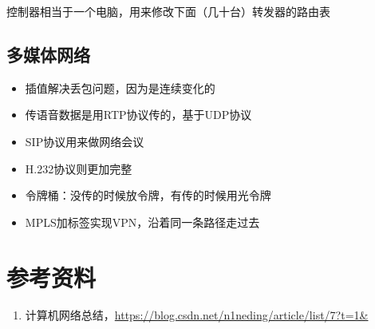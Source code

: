 \begin{center}
\end{center}

控制器相当于一个电脑，用来修改下面（几十台）转发器的路由表

\subsection{多媒体网络}
\begin{itemize}
\item 插值解决丢包问题，因为是连续变化的
\item 传语音数据是用RTP协议传的，基于UDP协议
\item SIP协议用来做网络会议
\item H.232协议则更加完整
\item 令牌桶：没传的时候放令牌，有传的时候用光令牌
\item MPLS加标签实现VPN，沿着同一条路径走过去
\end{itemize}

\section{参考资料}
\begin{enumerate}
\item 计算机网络总结，\url{https://blog.csdn.net/n1neding/article/list/7?t=1&}
\end{enumerate}